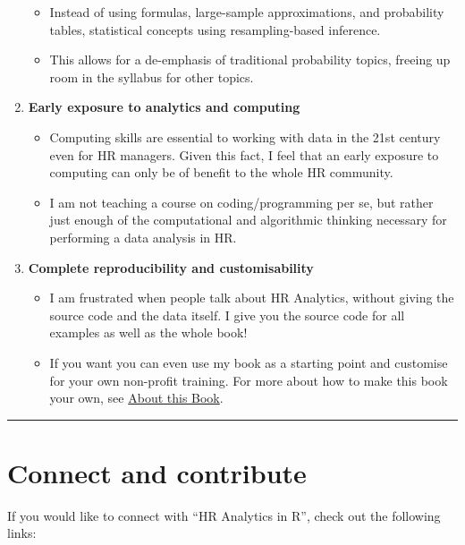 \documentclass[
  12pt, krantz2,
]{krantz}
\providecommand{\tightlist}{%
  \setlength{\itemsep}{0pt}\setlength{\parskip}{0pt}}
\begin{document}
\begin{enumerate}
  \begin{itemize}
  \tightlist
  \item
    Instead of using formulas, large-sample approximations, and probability tables, statistical concepts using resampling-based inference.
  \item
    This allows for a de-emphasis of traditional probability topics, freeing up room in the syllabus for other topics.
  \end{itemize}
\item
  \textbf{Early exposure to analytics and computing}

  \begin{itemize}
  \tightlist
  \item
    Computing skills are essential to working with data in the 21st century even for HR managers. Given this fact, I feel that an early exposure to computing can only be of benefit to the whole HR community.
  \item
    I am not teaching a course on coding/programming per se, but rather just enough of the computational and algorithmic thinking necessary for performing a data analysis in HR.
  \end{itemize}
\item
  \textbf{Complete reproducibility and customisability}

  \begin{itemize}
  \tightlist
  \item
    I am frustrated when people talk about HR Analytics, without giving the source code and the data itself. I give you the source code for all examples as well as the whole book!
  \item
    If you want you can even use my book as a starting point and customise for your own non-profit training. For more about how to make this book your own, see \protect\hyperlink{sec:about-book}{About this Book}.
  \end{itemize}
\end{enumerate}

\begin{center}\rule{0.5\linewidth}{\linethickness}\end{center}

\hypertarget{sec:connect-contribute}{%
\section{Connect and contribute}\label{sec:connect-contribute}}

If you would like to connect with ``HR Analytics in R'', check out the following links:
\end{document}
